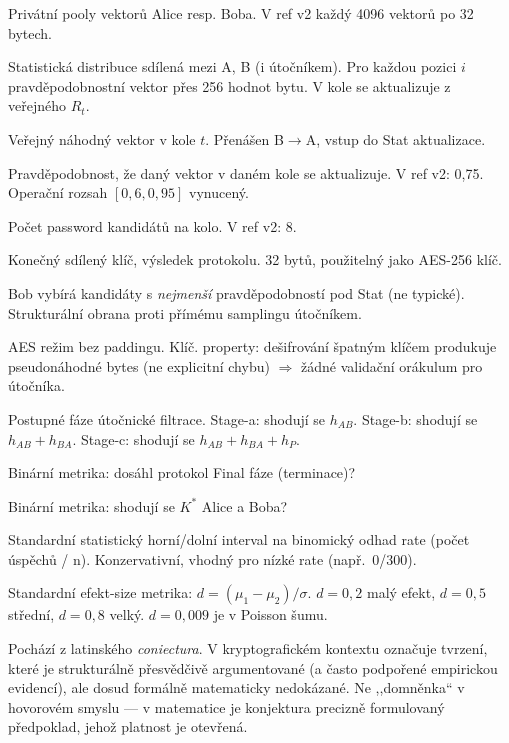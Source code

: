 \documentclass[11pt,a4paper]{article}
\begin{document}
\begin{description}[leftmargin=*, style=nextline]
\item[$\mathcal{V}_A, \mathcal{V}_B$] Privátní pooly vektorů Alice resp. Boba. V ref v2 každý 4096 vektorů po 32 bytech.
\item[$\mathcal{S}$ (Stat)] Statistická distribuce sdílená mezi A, B (i útočníkem). Pro každou pozici $i$ pravděpodobnostní vektor přes 256 hodnot bytu. V kole se aktualizuje z veřejného $R_t$.
\item[$R_t$] Veřejný náhodný vektor v kole $t$. Přenášen B$\to$A, vstup do Stat aktualizace.
\item[$p_\text{upd}$] Pravděpodobnost, že daný vektor v daném kole se aktualizuje. V ref v2: 0{,}75. Operační rozsah $[0{,}6, 0{,}95]$ vynucený.
\item[$M$] Počet password kandidátů na kolo. V ref v2: 8.
\item[$K^*$] Konečný sdílený klíč, výsledek protokolu. 32 bytů, použitelný jako AES-256 klíč.
\item[Tail selekce / CandMax filter] Bob vybírá kandidáty s \emph{nejmenší} pravděpodobností pod Stat (ne typické). Strukturální obrana proti přímému samplingu útočníkem.
\item[NoPadding (PaddingMode.None)] AES režim bez paddingu. Klíč. property: dešifrování špatným klíčem produkuje pseudonáhodné bytes (ne explicitní chybu) $\Rightarrow$ žádné validační orákulum pro útočníka.
\item[Stage-a / stage-b / stage-c] Postupné fáze útočnické filtrace. Stage-a: shodují se $h_{AB}$. Stage-b: shodují se $h_{AB} + h_{BA}$. Stage-c: shodují se $h_{AB} + h_{BA} + h_P$.
\item[FH (Final-Hit)] Binární metrika: dosáhl protokol Final fáze (terminace)?
\item[KM (Keys-Match)] Binární metrika: shodují se $K^*$ Alice a Boba?
\item[Clopper-Pearson CI] Standardní statistický horní/dolní interval na binomický odhad rate (počet úspěchů / n). Konzervativní, vhodný pro nízké rate (např.\ 0/300).
\item[Cohenovo $d$] Standardní efekt-size metrika: $d = (\mu_1 - \mu_2)/\sigma$. $d = 0{,}2$ malý efekt, $d = 0{,}5$ střední, $d = 0{,}8$ velký. $d = 0{,}009$ je v Poisson šumu.
\item[Konjekturálně] Pochází z latinského \emph{coniectura}. V kryptografickém kontextu označuje tvrzení, které je strukturálně přesvědčivě argumentované (a často podpořené empirickou evidencí), ale dosud formálně matematicky nedokázané. Ne ,,domněnka`` v hovorovém smyslu --- v matematice je konjektura precizně formulovaný předpoklad, jehož platnost je otevřená.

\end{description}
\end{document}
